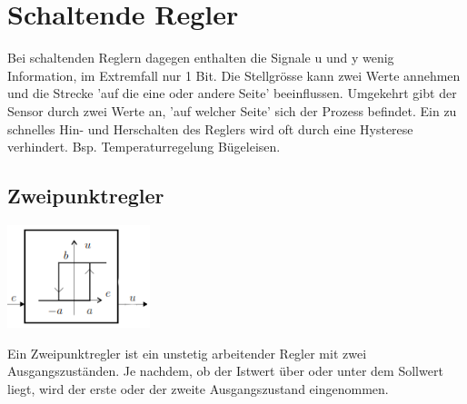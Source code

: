 \section{Schaltende Regler }
Bei schaltenden Reglern dagegen enthalten die Signale u und y wenig Information, im Extremfall nur 1 Bit. Die Stellgrösse kann zwei Werte annehmen und die Strecke 'auf die eine oder andere Seite' beeinflussen. Umgekehrt gibt der Sensor durch zwei Werte an, 'auf welcher Seite' sich der Prozess befindet. Ein zu schnelles Hin- und Herschalten des Reglers wird oft durch eine Hysterese verhindert. Bsp. Temperaturregelung Bügeleisen. 

	\subsection{Zweipunktregler }
		\begin{minipage}{5cm}
 		\includegraphics[height=3cm]{./bilder/Zweipunkteregler.png}
        \end{minipage}
		\begin{minipage}{12cm}
        Ein Zweipunktregler ist ein unstetig arbeitender Regler mit zwei Ausgangszuständen. Je nachdem, ob der Istwert über oder unter dem Sollwert liegt, wird der erste oder der zweite Ausgangszustand eingenommen. 
        \end{minipage}
	
